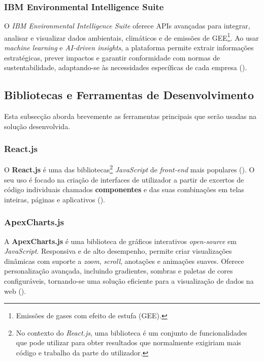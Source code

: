 \subsubsection{IBM Environmental Intelligence Suite}

O \textit{IBM Environmental Intelligence Suite} oferece APIs avançadas para integrar, analisar e visualizar dados ambientais, climáticos e de emissões de GEE\footnote{Emissões de gases com efeito de estufa (GEE).}. Ao usar \textit{machine learning} e \textit{AI-driven insights}, a plataforma permite extrair informações estratégicas, prever impactos e garantir conformidade com normas de sustentabilidade, adaptando-se às necessidades específicas de cada empresa (\cite{IBM2025}).

\subsection{Bibliotecas e Ferramentas de Desenvolvimento}
\label{subsec: BFD}

Esta subsecção aborda brevemente as ferramentas principais que serão usadas na solução desenvolvida.

\subsubsection{React.js}

O \textbf{React.js} é uma das bibliotecas\footnote{No contexto do \textit{React.js}, uma biblioteca é um conjunto de funcionalidades que pode utilizar para obter resultados que normalmente exigiriam mais código e trabalho da parte do utilizador.} \textit{JavaScript} de \textit{front-end} mais populares (\cite{Schwarzmuller2022}). O seu uso é focado na criação de interfaces de utilizador a partir de excertos de código individuais chamados \textbf{componentes} e das suas combinações em telas inteiras, páginas e aplicativos (\cite{React2025}).

\subsubsection{ApexCharts.js}

A \textbf{ApexCharts.js} é uma biblioteca de gráficos interativos \textit{open-source} em \textit{JavaScript}. Responsiva e de alto desempenho, permite criar visualizações dinâmicas com suporte a \textit{zoom}, \textit{scroll}, anotações e animações suaves. Oferece personalização avançada, incluindo gradientes, sombras e paletas de cores configuráveis, tornando-se uma solução eficiente para a visualização de dados na web (\cite{Apexcharts2025}).


 \vspace{20mm} 




